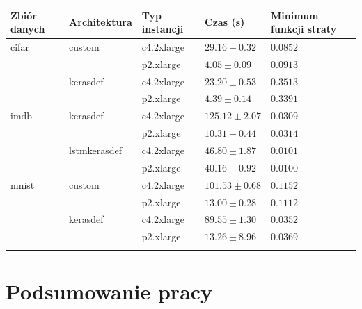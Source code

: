 \documentclass[12pt,a4paper,twoside]{article}
\begin{document}
\begin{tabular}{lllll}
\toprule
Zbiór danych & Architektura & Typ instancji & Czas (s) & Minimum funkcji straty \\
\midrule
cifar & custom & c4.2xlarge & $29.16\pm0.32$ & $0.0852$ \\
      & & p2.xlarge & $4.05\pm0.09$ & $0.0913$ \\
\midrule
      & kerasdef & c4.2xlarge & $23.20\pm0.53$ & $0.3513$ \\
      & & p2.xlarge & $4.39\pm0.14$ & $0.3391$ \\
\midrule
imdb & kerasdef & c4.2xlarge & $125.12\pm2.07$ & $0.0309$ \\
      & & p2.xlarge & $10.31\pm0.44$ & $0.0314$ \\
\midrule
      & lstmkerasdef & c4.2xlarge & $46.80\pm1.87$ & $0.0101$ \\
      & & p2.xlarge & $40.16\pm0.92$ & $0.0100$ \\
\midrule
mnist & custom & c4.2xlarge & $101.53\pm0.68$ & $0.1152$ \\
      & & p2.xlarge & $13.00\pm0.28$ & $0.1112$ \\
\midrule
      & kerasdef & c4.2xlarge & $89.55\pm1.30$ & $0.0352$ \\
      & & p2.xlarge & $13.26\pm8.96$ & $0.0369$ \\
\bottomrule
\label{tab:experiment_results}
\end{tabular}

\clearpage

\section{Podsumowanie pracy}

\clearpage
\end{document}
